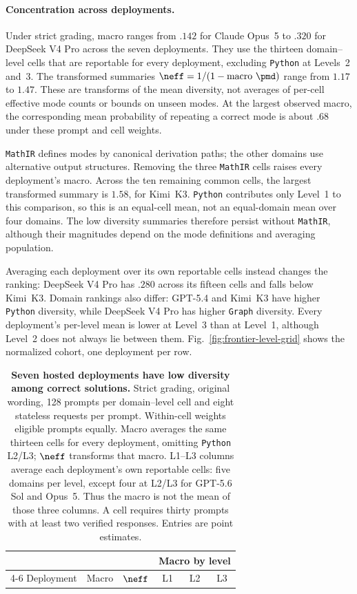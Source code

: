 \paragraph{Concentration across deployments.}
Under strict grading, macro \pmd{} ranges from $.142$ for Claude Opus~5 to
$.320$ for DeepSeek V4 Pro across the seven deployments. They use the thirteen domain--level cells that
are reportable for every deployment, excluding \texttt{Python} at Levels~2 and~3.
The transformed summaries $\neff=1/(1-\text{macro }\pmd)$ range from
$1.17$ to $1.47$. These are transforms of the mean diversity,
not averages of per-cell effective mode counts or bounds on unseen modes.
At the largest observed macro, the corresponding mean probability of
repeating a correct mode is about $.68$ under these prompt and cell weights.

\texttt{MathIR} defines modes by canonical derivation paths; the other domains use
alternative output structures. Removing the three \texttt{MathIR} cells raises every
deployment's macro. Across the ten remaining common cells, the largest
transformed summary is $1.58$, for Kimi~K3. \texttt{Python}
contributes only Level~1 to this comparison, so this is an equal-cell mean,
not an equal-domain mean over four domains. The low diversity summaries
therefore persist without \texttt{MathIR}, although their magnitudes depend on the
mode definitions and averaging population.

Averaging each deployment over its own reportable cells instead changes the
ranking: DeepSeek V4 Pro has $.280$ across its fifteen cells and falls below
Kimi~K3. Domain rankings also differ: GPT-5.4 and Kimi~K3 have higher \texttt{Python}
diversity, while DeepSeek V4 Pro has higher \texttt{Graph} diversity. Every deployment's
per-level mean is lower at Level~3 than at Level~1, although Level~2 does not
always lie between them. Fig.~\ref{fig:frontier-level-grid} shows the
normalized cohort, one deployment per row.

\begin{table}[!htbp]
  \centering
  \caption{\textbf{Seven hosted deployments have low diversity among correct solutions.}
  Strict grading, original wording, 128 prompts per domain--level cell and
  eight stateless requests per prompt. Within-cell \pmd{} weights eligible
  prompts equally. Macro \pmd{} averages the same thirteen cells for every
  deployment, omitting \texttt{Python} L2/L3; $\neff$ transforms that macro.
  L1--L3 columns average each deployment's own reportable cells: five domains
  per level, except four at L2/L3 for GPT-5.6 Sol and Opus~5. Thus the macro
  is not the mean of those three columns. A cell requires thirty prompts
  with at least two verified responses. Entries are point estimates.}
  \label{tab:hosted-cohort-mode-diversity}
  \small
  \begin{tabular}{lccccc}
    \toprule
    & & & \multicolumn{3}{c}{Macro \pmd{} by level} \\
    \cmidrule(lr){4-6}
    Deployment & Macro \pmd{} & $\neff$ & L1 & L2 & L3 \\
    \midrule
    
  \end{tabular}
\end{table}

